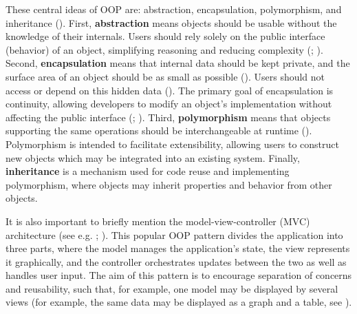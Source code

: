 \documentclass[
  openany]{book}
\theoremstyle{definition}
\theoremstyle{definition}
\theoremstyle{definition}
\theoremstyle{definition}
\theoremstyle{remark}
\begin{document}
These central ideas of OOP are: abstraction, encapsulation, polymorphism, and inheritance (). First, \textbf{abstraction} means objects should be usable without the knowledge of their internals. Users should rely solely on the public interface (behavior) of an object, simplifying reasoning and reducing complexity (; ). Second, \textbf{encapsulation} means that internal data should be kept private, and the surface area of an object should be as small as possible (). Users should not access or depend on this hidden data (). The primary goal of encapsulation is continuity, allowing developers to modify an object's implementation without affecting the public interface (; ). Third, \textbf{polymorphism} means that objects supporting the same operations should be interchangeable at runtime (). Polymorphism is intended to facilitate extensibility, allowing users to construct new objects which may be integrated into an existing system. Finally, \textbf{inheritance} is a mechanism used for code reuse and implementing polymorphism, where objects may inherit properties and behavior from other objects.

It is also important to briefly mention the model-view-controller (MVC) architecture (see e.g. ; ). This popular OOP pattern divides the application into three parts, where the model manages the application's state, the view represents it graphically, and the controller orchestrates updates between the two as well as handles user input. The aim of this pattern is to encourage separation of concerns and reusability, such that, for example, one model may be displayed by several views (for example, the same data may be displayed as a graph and a table, see ).
\end{document}
